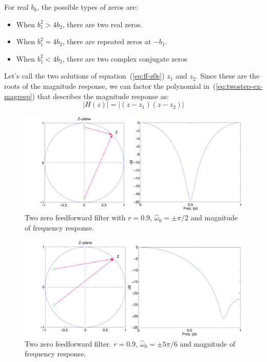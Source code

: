 For real $b_k$, the possible types of zeros are:
\begin{itemize}
\item When $b_1^2 > 4b_2$, there are two real zeros.
\item When $b_1^2 = 4b_2$, there are repeated zeros at $-b_1$.
\item When $b_1^2 < 4b_2$, there are two complex conjugate zeros
\end{itemize}
Let's call the two solutions of equation~(\ref{eq:ff-z0s}) $z_1$ and
$z_2$.  Since these are the roots of the magnitude response, we can
factor the polynomial in~(\ref{eq:twostep-ex-magresp}) that describes
the magnitude response as:
\begin{equation}
|H(z)| = |(z - z_1)(z - z_2)| \label{eq:twostep-factored}
\end{equation}

\begin{figure}[t]
\centerline{\includegraphics[width=6in]{ch-fir/ffexp_2tdelay_czh90_r0-9}}
\caption[Two zero filter $r=0.9$, $\hat{\omega}_0=\pm\pi/2$.]{Two zero feedforward filter with $r=0.9$, $\hat{\omega}_0=\pm\pi/2$ and magnitude of frequency response.
\label{fig:ff-exp2zs90}}
\end{figure}

\begin{figure}[t]
\centerline{\includegraphics[width=6in]{ch-fir/ffexp_2tdelay_czh150_r0-9}}
\caption[Two zero filter $r=0.9$, $\hat{\omega}_0=\pm5\pi/6$.]{Two zero feedforward filter. $r=0.9$, $\hat{\omega}_0=\pm5\pi/6$ and magnitude of frequency response.
\label{fig:ff-exp2zs150}}
\end{figure}

